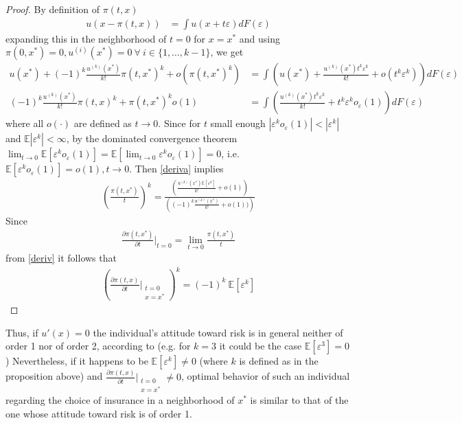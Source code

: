 \documentclass[a4paper]{article}
\newcommand{\expect}{\mathbb{E}}
\newcommand{\eps}{\varepsilon}
\begin{document}
\begin{proof}
	By definition of $\pi(t, x)$
	\begin{align*}
		u(x-\pi(t, x)) &= \int u(x+t\eps)dF(\eps)
	\end{align*}
expanding this in the neighborhood of $t=0$ for $x=x^*$ and using $\pi(0, x^*) = 0, u^{(i)}(x^*) = 0\ \forall\ i\in\{1, \dots, k-1\}$, we get
\begin{align}\label{deriva}
	u(x^*) + (-1)^k \frac{u^{(k)}(x^*)}{k!}\pi(t, x^*)^k + o(\pi(t, x^*)^k) &= \int \left(u(x^*) + \frac{u^{(k)}(x^*)t^k\eps^k}{k!}+o(t^k\eps^k) \right)dF(\eps) \nonumber\\
(-1)^k \frac{u^{(k)}(x^*)}{k!}\pi(t, x)^k + \pi(t, x^*)^ko(1) &= \int \left(\frac{u^{(k)}(x^*)t^k\eps^k}{k!}+t^k\eps^ko_{\eps}(1) \right)dF(\eps)
\end{align}
where all $o(\cdot)$ are defined as $t \to 0$.
Since for $t$ small enough $|\eps^ko_{\eps}(1)| < |\eps^k|$ and $\expect|\eps^k|<\infty$, by the dominated convergence theorem $\lim_{t\to0}\expect[\eps^ko_{\eps}(1)] = \expect[\lim_{t\to0}\eps^ko_{\eps}(1)] = 0$, i.e. $\expect[\eps^ko_{\eps}(1)] = o(1), t\to0$.
Then \eqref{deriva} implies
\begin{align}\label{deriv}
	\left(\frac{\pi(t, x^*)}{t}\right)^k = \frac{\left( \frac{u^{(k)}(x^*)\expect[\eps^k]}{k!} + o(1) \right)}{\left( (-1)^k \frac{u^{(k)}(x^*)}{k!} + o(1)) \right)}
\end{align}
Since
\begin{align*}
	\frac{\partial \pi(t, x^*)}{\partial t}\bigg|_{t = 0} = \lim_{t\to0}\frac{\pi(t, x^*)}{t}
\end{align*}
from \eqref{deriv} it follows that
\begin{align*}
	\left( \frac{\partial \pi(t, x)}{\partial t} \bigg|_{\substack{t = 0\\x = x^*}} \right)^k = (-1)^k\ \expect[\varepsilon^k]
\end{align*}
\end{proof}
Thus, if $u'(x) = 0$ the individual's attitude toward risk is in general neither of order 1 nor of order 2, according to \cite{segal1990first} (e.g. for $k=3$ it could be the case $\expect[\eps^3] = 0$) Nevertheless, if it happens to be $\expect[\eps^k] \neq 0$ (where $k$ is defined as in the proposition above) and $\frac{\partial \pi(t, x)}{\partial t}\bigg|_{\substack{t=0\\x = x^*}} \neq 0$, optimal behavior of such an individual regarding the choice of insurance in a neighborhood of $x^*$ is similar to that of the one whose attitude toward risk is of order 1.
\end{document}
